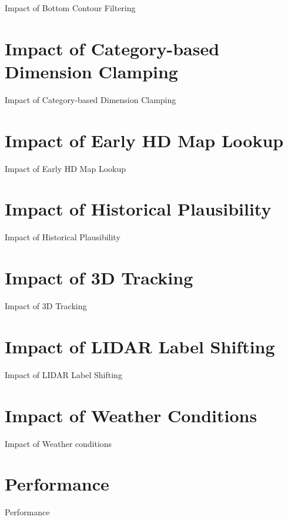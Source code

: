 Impact of Bottom Contour Filtering


\section{Impact of Category-based Dimension Clamping}
\label{sec:impactsizefiltering}

Impact of Category-based Dimension Clamping


\section{Impact of Early HD Map Lookup}
\label{sec:impactearlymap}

Impact of Early HD Map Lookup


\section{Impact of Historical Plausibility}
\label{sec:impacthistplausibility}

Impact of Historical Plausibility


\section{Impact of 3D Tracking}
\label{sec:impacttracking}

Impact of 3D Tracking


\section{Impact of LIDAR Label Shifting}
\label{sec:impactlabelshifting}

Impact of LIDAR Label Shifting


\section{Impact of Weather Conditions}
\label{sec:weather}

Impact of Weather conditions


\section{Performance}
\label{sec:performance}

Performance

